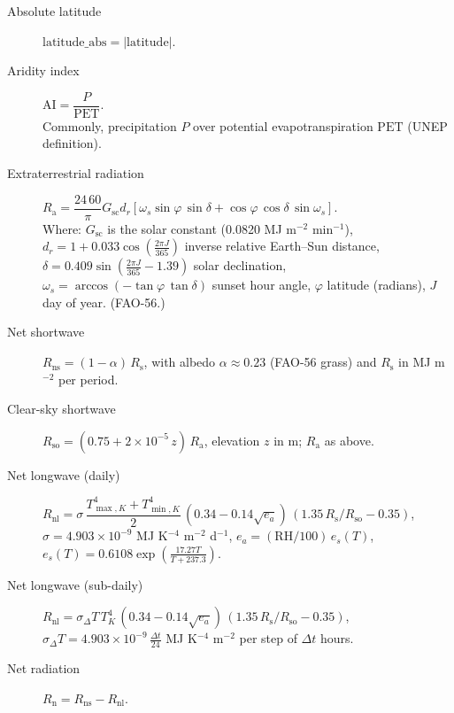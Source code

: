 \begin{description}
  \item[Absolute latitude] $\mathrm{latitude\_abs} = |\mathrm{latitude}|$.

  \item[Aridity index] $\mathrm{AI} = \dfrac{P}{\mathrm{PET}}$.\\
  Commonly, precipitation $P$ over potential evapotranspiration $\mathrm{PET}$ (UNEP definition).

  \item[Extraterrestrial radiation] $R_\mathrm{a} = \dfrac{24\,60}{\pi} G_\mathrm{sc} d_r [\omega_s \sin\varphi\,\sin\delta + \cos\varphi\,\cos\delta\,\sin\omega_s]$.\\
  Where: $G_\mathrm{sc}$ is the solar constant (0.0820 MJ m$^{-2}$ min$^{-1}$), $d_r = 1 + 0.033\cos(\tfrac{2\pi J}{365})$ inverse relative Earth--Sun distance, $\delta = 0.409\sin(\tfrac{2\pi J}{365} - 1.39)$ solar declination, $\omega_s = \arccos(-\tan\varphi\,\tan\delta)$ sunset hour angle, $\varphi$ latitude (radians), $J$ day of year. (FAO-56.)

  \item[Net shortwave] $R_\mathrm{ns} = (1-\alpha)\,R_\mathrm{s}$, with albedo $\alpha\approx 0.23$ (FAO-56 grass) and $R_\mathrm{s}$ in MJ m$^{-2}$ per period.

  \item[Clear-sky shortwave] $R_\mathrm{so}=(0.75+2\times10^{-5}\,z)\,R_\mathrm{a}$, elevation $z$ in m; $R_\mathrm{a}$ as above.

  \item[Net longwave (daily)] $R_\mathrm{nl}=\sigma\,\dfrac{T_{\max,K}^4 + T_{\min,K}^4}{2}\,(0.34-0.14\sqrt{e_a})\,(1.35\,R_\mathrm{s}/R_\mathrm{so}-0.35)$,\\ $\sigma=4.903\times10^{-9}$ MJ K$^{-4}$ m$^{-2}$ d$^{-1}$, $e_a=(\mathrm{RH}/100)\,e_s(T)$, $e_s(T)=0.6108\exp\!(\tfrac{17.27T}{T+237.3})$.

  \item[Net longwave (sub-daily)] $R_\mathrm{nl}=\sigma_\Delta T\,T_K^4\,(0.34-0.14\sqrt{e_a})\,(1.35\,R_\mathrm{s}/R_\mathrm{so}-0.35)$,\\ $\sigma_\Delta T=4.903\times10^{-9}\,\tfrac{\Delta t}{24}$ MJ K$^{-4}$ m$^{-2}$ per step of $\Delta t$ hours.

  \item[Net radiation] $R_\mathrm{n}=R_\mathrm{ns}-R_\mathrm{nl}$.


\end{description}
